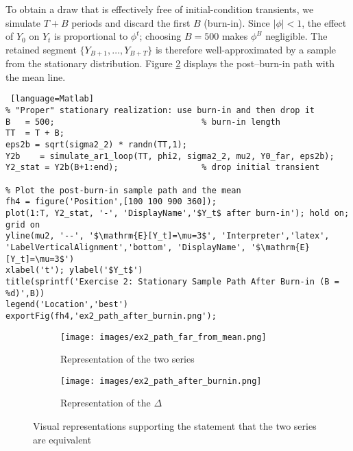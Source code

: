 \documentclass[dvipsnames,11pt]{article}
\begin{document}
\begin{solution}
                To obtain a draw that is effectively free of initial-condition transients, we simulate $T+B$ periods and discard the first $B$ (burn-in). Since $|\phi|<1$, the effect of $Y_0$ on $Y_t$ is proportional to $\phi^t$; choosing $B=500$ makes $\phi^B$ negligible. The retained segment $\{Y_{B+1},\dots,Y_{B+T}\}$ is therefore well-approximated by a sample from the stationary distribution. Figure \ref{fig:ex2_path_after_burnin} displays the post--burn-in path with the mean line.

\begin{lstlisting} [language=Matlab]
% "Proper" stationary realization: use burn-in and then drop it
B   = 500;                              % burn-in length
TT  = T + B;
eps2b = sqrt(sigma2_2) * randn(TT,1);
Y2b    = simulate_ar1_loop(TT, phi2, sigma2_2, mu2, Y0_far, eps2b);
Y2_stat = Y2b(B+1:end);                 % drop initial transient

% Plot the post-burn-in sample path and the mean
fh4 = figure('Position',[100 100 900 360]);
plot(1:T, Y2_stat, '-', 'DisplayName','$Y_t$ after burn-in'); hold on; grid on
yline(mu2, '--', '$\mathrm{E}[Y_t]=\mu=3$', 'Interpreter','latex', 'LabelVerticalAlignment','bottom', 'DisplayName', '$\mathrm{E}[Y_t]=\mu=3$')
xlabel('t'); ylabel('$Y_t$')
title(sprintf('Exercise 2: Stationary Sample Path After Burn-in (B = %d)',B))
legend('Location','best')
exportFig(fh4,'ex2_path_after_burnin.png');
\end{lstlisting}

                \begin{figure}[h]
                     \centering
                     \begin{subfigure}[b]{0.49\textwidth}
                         \centering
                         \texttt{[image: images/ex2\_path\_far\_from\_mean.png]}
                         \caption{Representation of the two series}
                         \label{fig:ex2_path_far_from_mean}                         
                     \end{subfigure}
                     \hfill
                     \begin{subfigure}[b]{0.49\textwidth}
                         \centering
                         \texttt{[image: images/ex2\_path\_after\_burnin.png]}
                         \caption{Representation of the \(\Delta\)}
                         \label{fig:ex2_path_after_burnin}
                     \end{subfigure}
                        \label{fig:ex_1c}
                        \caption{Visual representations supporting the statement that the two series are equivalent}
                \end{figure}
        
    \end{solution}
\end{document}
